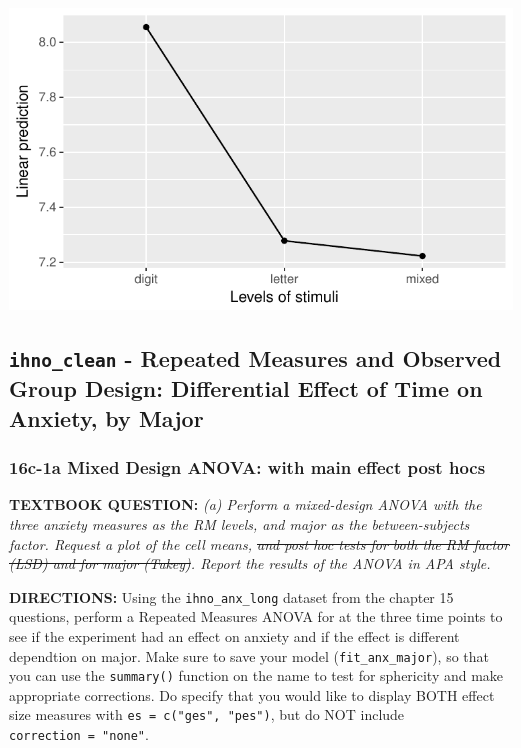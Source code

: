\documentclass[]{article}
\begin{document}
\begin{center}\includegraphics{Unit_5_assignment_KEY_R__spr18__files/figure-latex/unnamed-chunk-77-1} \end{center}

\clearpage

\subsection{\texorpdfstring{\texttt{ihno\_clean} - Repeated Measures and
Observed Group Design: Differential Effect of Time on Anxiety, by
Major}{ihno\_clean - Repeated Measures and Observed Group Design: Differential Effect of Time on Anxiety, by Major}}\label{ihno_clean---repeated-measures-and-observed-group-design-differential-effect-of-time-on-anxiety-by-major}

\subsubsection{16c-1a Mixed Design ANOVA: with main effect post
hocs}\label{c-1a-mixed-design-anova-with-main-effect-post-hocs}

\textbf{TEXTBOOK QUESTION:} \emph{(a) Perform a mixed-design ANOVA with
the three anxiety measures as the RM levels, and major as the
between-subjects factor. Request a plot of the cell means, \sout{and
post hoc tests for both the RM factor (LSD) and for major (Tukey)}.
Report the results of the ANOVA in APA style.}

\textbf{DIRECTIONS:} Using the \texttt{ihno\_anx\_long} dataset from the
chapter 15 questions, perform a Repeated Measures ANOVA for at the three
time points to see if the experiment had an effect on anxiety and if the
effect is different dependtion on major. Make sure to save your model
(\texttt{fit\_anx\_major}), so that you can use the \texttt{summary()}
function on the name to test for sphericity and make appropriate
corrections. Do specify that you would like to display BOTH effect size
measures with \texttt{es\ =\ c("ges",\ "pes")}, but do NOT include
\texttt{correction\ =\ "none"}.
\end{document}
